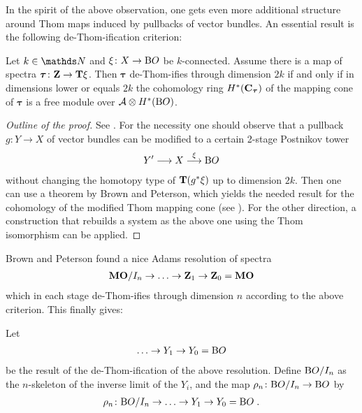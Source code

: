 In the spirit of the above observation, one gets even more additional
structure around Thom maps induced by pullbacks of vector bundles.
An essential result is the following de-Thom-ification criterion:
\begin{Thm*}
  Let $k\in\Nat$ and $\xi\colon X\to\mathrm{B}O$ be $k$-connected.
  Assume there is a map of spectra
  $\bm{\tau}\colon\bm{\mathrm{Z}}\to\bm{\mathrm{T}}{\xi}$.
  Then $\bm{\tau}$ de-Thom-ifies through dimension $2k$ if and only if
  in dimensions lower or equals $2k$ the cohomology ring
  $H^*(\bm{\mathrm{C}}_{\bm{\tau}})$ of the mapping cone of $\bm{\tau}$ is
  a free module over $\mathcal{A}\otimes H^*(\mathrm{B}O)$.  
  \begin{proof}[Outline of the proof]
    See \cite[Theorem~3.5]{immersionconj}.
    For the necessity one should observe that a pullback $g\colon Y\to X$ of
    vector bundles can be modified to a certain 2-stage Postnikov tower
    \begin{gather*}
      Y'\longrightarrow X\overset{\xi}{\longrightarrow}\mathrm{B}O
    \end{gather*}
    without changing the homotopy type of $\bm{\mathrm{T}}{({g}^*\xi)}$ up to
    dimension $2k$.
    Then one can use a theorem by Brown and Peterson, which yields the
    needed result for the cohomology of the modified Thom mapping cone
    (see \cite[Theorem~3.3]{immersionconj}).
    For the other direction, a construction that rebuilds a system as
    the above one using the Thom isomorphism can be applied.
  \end{proof}
\end{Thm*}


Brown and Peterson found a nice Adams resolution of spectra
\begin{gather*}
  \bm{\mathrm{MO}}/I_{n} \to\dotsc \to \bm{\mathrm{Z}}_1 \to \bm{\mathrm{Z}}_0 = \bm{\mathrm{MO}}
\end{gather*}
which in each stage de-Thom-ifies through dimension $n$ according to
the above criterion.
This finally gives:
\begin{Def}
  Let
  \begin{gather*}
    \dotsc \to Y_1 \to Y_0 = \mathrm{B}O
 \end{gather*}
  be the result of the de-Thom-ification of the above resolution.
  Define $\mathrm{B}O/I_{n}$ as the $n$-skeleton of the inverse limit of the
  $Y_i$, and the map $\rho_n\colon\mathrm{B}O/I_{n}\to\mathrm{B}O$ by
  \begin{gather*}
    \rho_n\colon\mathrm{B}O/I_{n}\to\dotsc\to Y_1\to Y_0=\mathrm{B}O
    \;.
  \end{gather*}
\end{Def}

